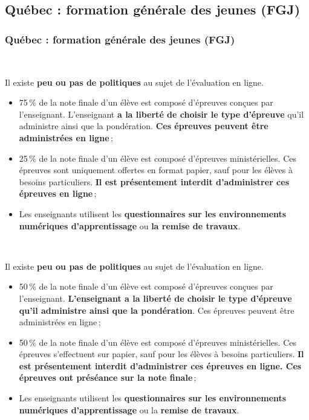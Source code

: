 \documentclass{beamer}
\begin{document}
		\subsection{Québec : formation générale des jeunes (FGJ)} 
			\begin{frame}[allowframebreaks]
				  \frametitle{Québec : formation générale des jeunes (FGJ)}
				 \begin{description}
					\item[Primaire / 1\up{re} à la 3\up{e} secondaire]  \ \ \par Il existe \textbf{peu ou pas de politiques} au sujet de l'évaluation en ligne.
						\begin{itemize}
							\item 75\,\% de la note finale d'un élève est composé d'épreuves conçues par l'enseignant. L'enseignant \textbf{a la liberté de choisir le type d'épreuve} qu'il administre ainsi que la pondération. \textbf{Ces épreuves peuvent être administrées en ligne}\,;
							\item 25\,\% de la note finale d'un élève est composé d'épreuves ministérielles. Ces épreuves sont uniquement offertes en format papier, sauf pour les élèves à besoins particuliers. \textbf{Il est présentement interdit d'administrer ces épreuves en ligne}\,;
							\item Les enseignants utilisent les \textbf{questionnaires sur les environnements numériques d'apprentissage} ou \textbf{la remise de travaux}.
						\end{itemize}
					\framebreak
					\item[4\up{e} et 5\up{e} secondaire]  \ \ \par Il existe \textbf{peu ou pas de politiques} au sujet de l'évaluation en ligne.
						\begin{itemize}
							\item 50\,\% de la note finale d'un élève est composé d'épreuves conçues par l'enseignant. \textbf{L'enseignant a la liberté de choisir le type d'épreuve qu'il administre ainsi que la pondération}. Ces épreuves peuvent être administrées en ligne\,;
							\item 50\,\% de la note finale d'un élève est composé d'épreuves ministérielles. Ces épreuves s'effectuent sur papier, sauf pour les élèves à besoins particuliers. \textbf{Il est présentement interdit d'administrer ces épreuves en ligne. Ces épreuves ont préséance sur la note finale}\,;
							\item Les enseignants utilisent les \textbf{questionnaires sur les environnements numériques d'apprentissage} ou la \textbf{remise de travaux}.

\end{itemize}
\end{description}
\end{frame}
\end{document}
